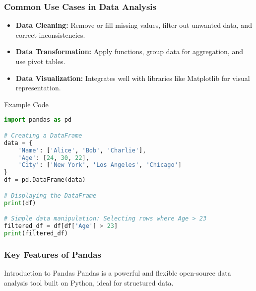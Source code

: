 \documentclass[aspectratio=169]{beamer}
\begin{document}
\begin{frame}[fragile]
    \frametitle{Common Use Cases in Data Analysis}
    \begin{itemize}
        \item \textbf{Data Cleaning:} Remove or fill missing values, filter out unwanted data, and correct inconsistencies.
        \item \textbf{Data Transformation:} Apply functions, group data for aggregation, and use pivot tables.
        \item \textbf{Data Visualization:} Integrates well with libraries like Matplotlib for visual representation.
    \end{itemize}
    
    \begin{block}{Example Code}
    \begin{lstlisting}[language=Python]
import pandas as pd

# Creating a DataFrame
data = {
    'Name': ['Alice', 'Bob', 'Charlie'],
    'Age': [24, 30, 22],
    'City': ['New York', 'Los Angeles', 'Chicago']
}
df = pd.DataFrame(data)

# Displaying the DataFrame
print(df)

# Simple data manipulation: Selecting rows where Age > 23
filtered_df = df[df['Age'] > 23]
print(filtered_df)
    \end{lstlisting}
    \end{block}
\end{frame}

\begin{frame}
    \frametitle{Key Features of Pandas}
    \begin{block}{Introduction to Pandas}
        Pandas is a powerful and flexible open-source data analysis tool built on Python, ideal for structured data.
    \end{block}
\end{frame}
\end{document}
